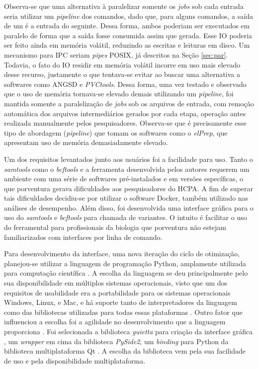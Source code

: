 \documentclass[cic,tc]{iiufrgs}
\begin{document}
Observa-se que uma alternativa à paralelizar somente os \textit{jobs} sob cada
entrada seria utilizar um \textit{pipeline} dos comandos, dado que, para alguns
comandos, a saída de um é a entrada do seguinte. Dessa forma, ambos poderiam
ser executados em paralelo de forma que a saída fosse consumida assim que
gerada. Esse IO poderia ser feito ainda em memória volátil, reduzindo as
escritas e leituras em disco. Um mecanismo para IPC seriam \textit{pipes} POSIX, já
descritos na Seção \ref{sec:par}. Todavia, o fato do IO residir em memória
volátil incorre em uso mais elevado desse recurso, justamente o que tentava-se
evitar ao buscar uma alternativa a softwares como ANGSD e \textit{PVCtools}.
Dessa forma, uma vez testado e observado que o uso de memória tornava-se
elevado demais utilizando um \textit{pipeline}, foi mantida somente a
paralelização de \textit{jobs} sob os arquivos de entrada, com remoção
automática dos arquivos intermediários gerados por cada etapa, operação antes
realizada manualmente pelos pesquisadores. Observa-se que é precisamente esse
tipo de abordagem (\textit{pipeline}) que tomam os softwares como o
\textit{elPrep}, que apresentam uso de memória demasiadamente elevado.

Um dos requisitos levantados junto aos usuários foi a facilidade para uso.
Tanto o \textit{samtools} como o \textit{bcftools} e a ferramenta desenvolvida
pelos autores requerem um ambiente com uma série de softwares pré-instalados e
em versões específicas, o que porventura gerava dificuldades aos pesquisadores
do HCPA. A fim de superar tais dificuldades decidiu-se por utilizar o software
Docker, também utilizado nas análises de desempenho. Além disso, foi
desenvolvida uma interface gráfica para o uso do \textit{samtools} e
\textit{bcftools} para chamada de variantes. O intuito é facilitar o uso do
ferramental para profissionais da biologia que porventura não estejam
familiarizados com interfaces por linha de comando.

Para desenvolvimento da interface, uma nova iteração do ciclo de otimização,
planejou-se utilizar a linguagem de programação Python, amplamente utilizada
para computação científica \cite{oliphant2007python}. A escolha da linguagem se
deu principalmente pelo sua disponibilidade em múltiplos sistemas operacionais,
visto que um dos requisitos de usabilidade era a portabilidade para os sistemas
operacionais Windows, Linux, e Mac, e há suporte tanto de interpretadores da
linguagem como das bibliotecas utilizadas para todas essas plataformas
\cite{oliphant2007python}. Outro fator que influenciou a escolha foi a
agilidade no desenvolvimento que a linguagem proporciona
\cite{oliphant2007python}. Foi selecionada a biblioteca \textit{guietta} para
criação da interface gráfica \cite{guietta}, um \textit{wrapper} em cima da
biblioteca \textit{PySide2}, um \textit{binding} para Python da biblioteca
multiplataforma Qt \cite{loganathan2013pyside}. A escolha da biblioteca vem
pela sua facilidade de uso e pela disponibilidade multiplataforma. 
\end{document}
